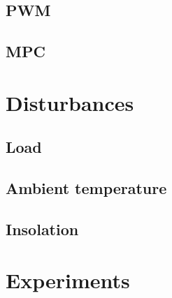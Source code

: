 \subsection{PWM}



\subsection{MPC}



\section{Disturbances}

\subsection{Load}



\subsection{Ambient temperature}



\subsection{Insolation}



\section{Experiments}
